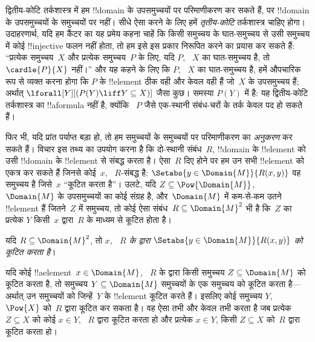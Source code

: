 \documentclass[../../../include/open-logic-section]{subfiles}
\begin{document}


\begin{explain}
द्वितीय-कोटि तर्कशास्त्र में हम !!{domain} के उपसमुच्चयों पर परिमाणीकरण कर
सकते हैं, पर !!{domain} के उपसमुच्चयों के समुच्चयों पर नहीं। सीधे ऐसा करने
के लिए हमें \emph{तृतीय-कोटि} तर्कशास्त्र चाहिए होगा। उदाहरणार्थ, यदि हम
कैंटर का यह प्रमेय कहना चाहें कि किसी समुच्चय के घात-समुच्चय से उसी समुच्चय
में कोई !!{injective} फलन नहीं होता, तो हम इसे इस प्रकार निरूपित करने का
प्रयास कर सकते हैं: ``प्रत्येक समुच्चय~$X$ और प्रत्येक समुच्चय~$P$ के लिए,
यदि $P$, ~$X$ का घात-समुच्चय है, तो $\cardle{P}{X}$ नहीं।'' और यह कहने के
लिए कि $P$, ~$X$ का घात-समुच्चय है, हमें औपचारिक रूप से व्यक्त करना होगा
कि $P$ के !!{element} ठीक वही और केवल वही हैं जो~$X$ के उपसमुच्चय हैं;
अर्थात् $\lforall[Y][(P(Y) \liff Y \subseteq X)]$ जैसा कुछ। समस्या
$P(Y)$ में है: यह द्वितीय-कोटि तर्कशास्त्र का !!a{formula} नहीं है, क्योंकि
~$P$ जैसे एक-स्थानी संबंध-चरों के तर्क केवल पद हो सकते हैं।

फिर भी, यदि प्रांत पर्याप्त बड़ा हो, तो हम समुच्चयों के समुच्चयों पर
परिमाणीकरण का \emph{अनुकरण} कर सकते हैं। विचार इस तथ्य का उपयोग करना है कि
दो-स्थानी संबंध~$R$, !!{domain} के !!{element} को उसी !!{domain} के
!!{element} से संबद्ध करता है। ऐसा~$R$ दिए होने पर हम उन सभी !!{element}
को एकत्र कर सकते हैं जिनसे कोई~$x$, ~$R$-संबद्ध है: $\Setabs{y \in
  \Domain{M}}{R(x,y)}$ वह समुच्चय है जिसे~$x$ ``कूटित करता है''। उलटे, यदि
$Z \subseteq \Pow{\Domain{M}}$, ~$\Domain{M}$ के उपसमुच्चयों का कोई संग्रह
है, और~$\Domain{M}$ में कम-से-कम उतने !!{element} हैं जितने~$Z$ में
समुच्चय, तो कोई ऐसा संबंध~$R \subseteq \Domain{M}^2$ भी है कि~$Z$ का
प्रत्येक $Y$ किसी~$x$ द्वारा~$R$ के माध्यम से कूटित होता है।
\end{explain}

\begin{defn}
यदि $R \subseteq \Domain{M}^2$, तो \emph{$x$, ~$R$ के द्वारा}
$\Setabs{y \in \Domain{M}}{R(x, y)}$ \emph{को कूटित करता है}।
\end{defn}

यदि कोई !!a{element}~$x \in \Domain{M}$, ~$R$ के द्वारा किसी समुच्चय $Z
\subseteq \Domain{M}$ को कूटित करता है, तो समुच्चय $Y \subseteq
\Domain{M}$ समुच्चयों के एक समुच्चय को कूटित करता है---अर्थात् उन
समुच्चयों को जिन्हें~$Y$ के !!{element} कूटित करते हैं। इसलिए कोई समुच्चय
$Y$, ~$\Pow{X}$ को~$R$ द्वारा कूटित कर सकता है। वह ऐसा तभी और केवल तभी
करता है जब प्रत्येक $Z \subseteq X$ को कोई $x \in Y$, ~$R$ द्वारा कूटित
करता हो और प्रत्येक $x \in Y$, किसी $Z \subseteq X$ को~$R$ द्वारा कूटित
करता हो।
\end{document}
